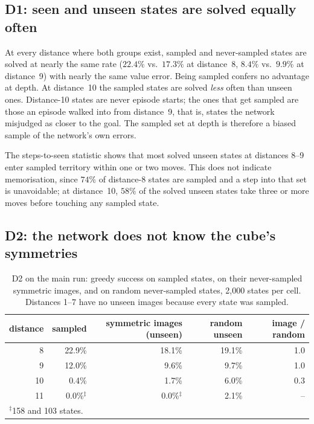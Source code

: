 \documentclass[11pt]{article}
\begin{document}
\subsection{D1: seen and unseen states are solved equally often}

At every distance where both groups exist, sampled and never-sampled states are solved at
nearly the same rate ($22.4\%$ vs.\ $17.3\%$ at distance~8, $8.4\%$ vs.\ $9.9\%$ at distance~9)
with nearly the same value error. Being sampled confers no advantage at depth. At distance~10
the sampled states are solved \emph{less} often than unseen ones. Distance-10 states are never
episode starts; the ones that get sampled are those an episode walked into from distance~9,
that is, states the network misjudged as closer to the goal. The sampled set at depth is
therefore a biased sample of the network's own errors.

The steps-to-seen statistic shows that most solved unseen states at distances 8--9 enter
sampled territory within one or two moves. This does not indicate memorisation, since $74\%$ of
distance-8 states are sampled and a step into that set is unavoidable; at distance~10, $58\%$ of
the solved unseen states take three or more moves before touching any sampled state.

\subsection{D2: the network does not know the cube's symmetries}

\begin{table}[t]
\centering\small
\caption{D2 on the main run: greedy success on sampled states, on their never-sampled symmetric
images, and on random never-sampled states, 2{,}000 states per cell. Distances 1--7 have no
unseen images because every state was sampled.}
\label{tab:sym}
\begin{tabular}{rrrrr}
\toprule
distance & sampled & symmetric images (unseen) & random unseen & image / random \\
\midrule
8  & 22.9\% & 18.1\% & 19.1\% & 1.0 \\
9  & 12.0\% & 9.6\%  & 9.7\%  & 1.0 \\
10 & 0.4\%  & 1.7\%  & 6.0\%  & 0.3 \\
11 & 0.0\%$^\ddagger$ & 0.0\%$^\ddagger$ & 2.1\% & -- \\
\bottomrule
\multicolumn{5}{l}{\footnotesize $^\ddagger$158 and 103 states.}
\end{tabular}
\end{table}
\end{document}
